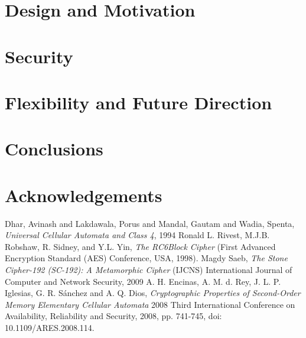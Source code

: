 \documentclass{article}
\begin{document}
\section{Design and Motivation}

\section{Security}

\section{Flexibility and Future Direction}

\section{Conclusions}

\section{Acknowledgements}

\begin{thebibliography}{unsrt}
  Dhar, Avinash and Lakdawala, Porus and Mandal, Gautam and Wadia, Spenta, \emph{Universal Cellular Automata and Class 4}, 1994
  Ronald L. Rivest, M.J.B. Robshaw, R. Sidney, and Y.L. Yin, \emph{The RC6\texttrademark Block Cipher} (First Advanced Encryption Standard (AES) Conference, USA, 1998).
  Magdy Saeb, \emph{The Stone Cipher-192 (SC-192): A Metamorphic Cipher} (IJCNS) International Journal of Computer and Network Security, 2009
  A. H. Encinas, A. M. d. Rey, J. L. P. Iglesias, G. R. Sánchez and A. Q. Dios, \emph{Cryptographic Properties of Second-Order Memory Elementary Cellular Automata} 2008 Third International Conference on Availability, Reliability and Security, 2008, pp. 741-745, doi: 10.1109/ARES.2008.114.
\end{thebibliography}
\end{document}
